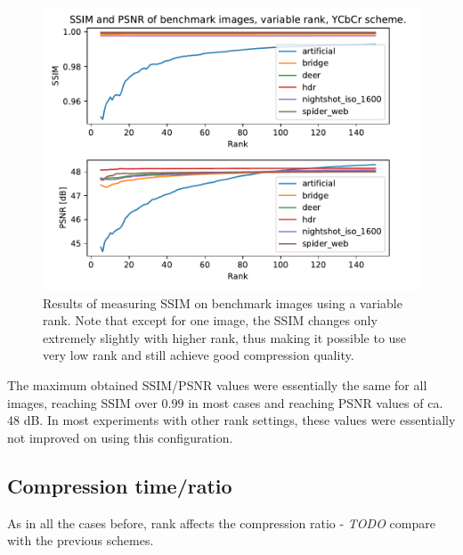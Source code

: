 \documentclass[thesis=M,english]{FITthesis}[2012/10/20]
\begin{document}
\begin{figure}[h]
  \centering
  \includegraphics[scale=0.65]{imgs/results/psnr_ssim_ycbcr}
  \caption{Results of measuring SSIM on benchmark images using a variable rank.
  		  Note that except for one image, the SSIM changes only extremely slightly
  		  with higher rank, thus making it possible to use very low rank and still
  		  achieve good compression quality.}
  \label{fig:ssim_ycbcr}
\end{figure}

The maximum obtained SSIM/PSNR values were essentially the same for all images, reaching
SSIM over $0.99$ in most cases and reaching PSNR values of ca. 48 dB. In most experiments
with other rank settings, these values were essentially not improved on using this configuration. 

\subsection{Compression time/ratio}
As in all the cases before, rank affects the compression ratio - \emph{TODO} compare with the previous
schemes.
\end{document}
